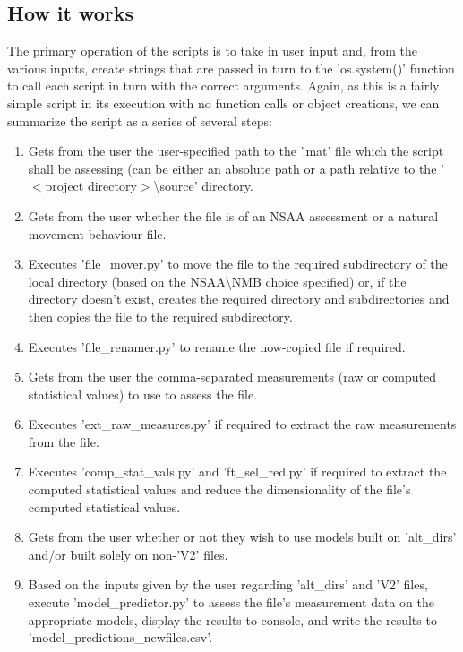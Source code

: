\documentclass[12pt,twoside]{report}
\begin{document}
\subsection{How it works}

\quad The primary operation of the scripts is to take in user input and, from the various inputs, create strings that are passed in turn to the 'os.system()' function to call each script in turn with the correct arguments. Again, as this is a fairly simple script in its execution with no function calls or object creations, we can summarize the script as a series of several steps:

\begin{enumerate}
	\item Gets from the user the user-specified path to the '.mat' file which the script shall be assessing (can be either an absolute path or a path relative to the '$<$project directory$>$\textbackslash source' directory.
	\item Gets from the user whether the file is of an NSAA assessment or a natural movement behaviour file.
	\item Executes 'file\_mover.py' to move the file to the required subdirectory of the local directory (based on the NSAA\textbackslash NMB choice specified) or, if the directory doesn't exist, creates the required directory and subdirectories and then copies the file to the required subdirectory.
	\item Executes 'file\_renamer.py' to rename the now-copied file if required.
	\item Gets from the user the comma-separated measurements (raw or computed statistical values) to use to assess the file.
	\item Executes 'ext\_raw\_measures.py' if required to extract the raw measurements from the file.
	\item Executes 'comp\_stat\_vals.py' and 'ft\_sel\_red.py' if required to extract the computed statistical values and reduce the dimensionality of the file’s computed statistical values.
	\item Gets from the user whether or not they wish to use models built on 'alt\_dirs' and/or built solely on non-'V2' files.
	\item Based on the inputs given by the user regarding 'alt\_dirs' and 'V2' files, execute 'model\_predictor.py' to assess the file's measurement data on the appropriate models, display the results to console, and write the results to 'model\_predictions\_newfiles.csv'.
\end{enumerate}
\end{document}
